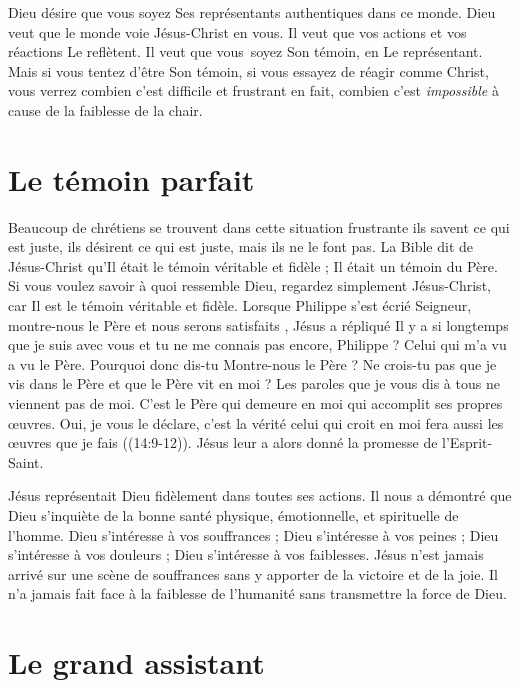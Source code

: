 Dieu désire que vous soyez Ses représentants authentiques dans ce monde.
 Dieu veut que le monde voie Jésus-Christ en vous.
 Il veut que vos actions et vos réactions Le reflètent.
 Il veut que vous~soyez Son témoin, en Le représentant.
 Mais si vous tentez d'être Son témoin, si vous essayez de réagir comme Christ,
 vous verrez combien c'est difficile et frustrant
 \ocadr en fait, combien c'est \emph{impossible}
 à cause de la faiblesse de la chair.

\section{Le t\'emoin parfait}

Beaucoup de chrétiens se trouvent dans cette situation frustrante\frcolon{}
 ils savent ce qui est juste, ils désirent ce qui est juste, mais ils ne le font pas.
 La Bible dit de Jésus-Christ qu'Il était le témoin véritable et fidèle ;
 Il était un témoin du Père.
 Si vous voulez savoir à quoi ressemble Dieu, regardez simplement
 Jésus-Christ, car Il est le témoin véritable et fidèle.
 Lorsque Philippe s'est écrié\frcolon{}
 \Og Seigneur, montre-nous le Père et nous serons satisfaits \Fg{},
 Jésus a répliqué\frcolon{}
 \Og Il y a si longtemps que je suis avec vous et tu ne me connais pas encore,
 Philippe ? Celui qui m'a vu a vu le Père. Pourquoi donc dis-tu\frcolon{}
 \Og Montre-nous le Père \Fg{} ?
 Ne crois-tu pas que je vis dans le Père et que le Père vit en moi ?
 Les paroles que je vous dis à tous ne viennent pas de moi.
 C'est le Père qui demeure en moi qui accomplit ses propres œuvres.
 Oui, je vous le déclare, c'est la vérité\frcolon{}
 celui qui croit en moi fera aussi les œuvres que je fais \Fg{}
 ((14:9-12)). Jésus leur a alors donné la promesse
 de l'Esprit-Saint.

Jésus représentait Dieu fidèlement dans toutes ses actions.
 Il nous a démontré que Dieu s'inquiète de la bonne santé physique,
 émotionnelle, et spirituelle de l'homme.
 Dieu s'intéresse à vos souffrances ; Dieu s'intéresse à vos peines ;
 Dieu s'intéresse à vos douleurs ; Dieu s'intéresse à vos faiblesses.
 Jésus n'est jamais arrivé sur une scène de souffrances sans y apporter
 de la victoire et de la joie. Il n'a jamais fait face à la faiblesse
 de l'humanité sans transmettre la force de Dieu.

\section{Le grand assistant}

